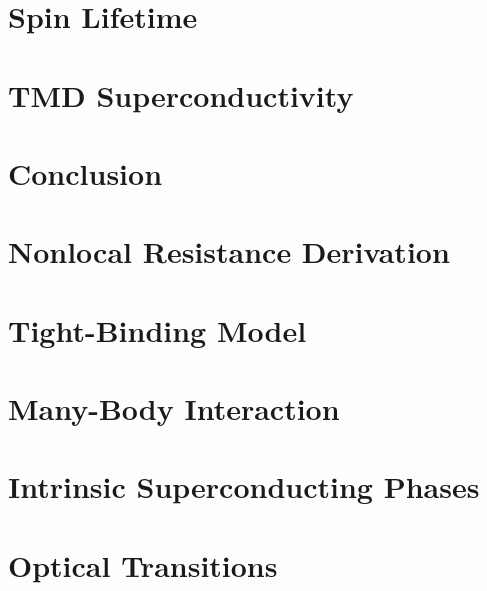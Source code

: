 \documentclass[oneside,12pt]{memoir}
\begin{document}
  \frontmatter{}
  
  
  
  \pagestyle{thesis}
  
  
  
  \newpage
  \tableofcontents
  \newpage
  \listoffigures
  \mainmatter{}
  

  \chapter{Spin Lifetime}\label{s:spin-lifetime}
  
  
  
  

  \chapter{TMD Superconductivity}\label{s:dichalcogenides}
  
  
  
  
  

  \chapter{Conclusion}
  

  \begin{appendices}

    \chapter{Nonlocal Resistance Derivation}
    

    \chapter{Tight-Binding Model}
    

    \chapter{Many-Body Interaction}
    

    \chapter{Intrinsic Superconducting Phases}
    

    \chapter{Optical Transitions}
    
  \end{appendices}
  \backmatter{}
  \SingleSpacing{}
  \printbibliography{}
\end{document}
